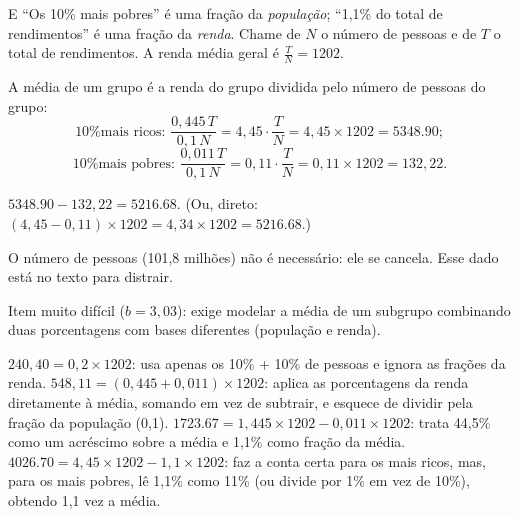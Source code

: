 \begin{resolucao}{E}
 ``Os 10\% mais pobres'' é uma fração da
\emph{população}; ``1,1\% do total de rendimentos'' é uma fração da
\emph{renda}. Chame de $N$ o número de pessoas e de $T$ o total de rendimentos.
A renda média geral é $\frac{T}{N} = \num{1202}$.

 A média de um grupo é a renda do grupo
dividida pelo número de pessoas do grupo:
\[
  \text{10\% mais ricos: } \frac{0{,}445\,T}{0{,}1\,N} = 4{,}45\cdot\frac{T}{N}
  = 4{,}45\times\num{1202} = \num{5348,90};
\]
\[
  \text{10\% mais pobres: } \frac{0{,}011\,T}{0{,}1\,N} = 0{,}11\cdot\frac{T}{N}
  = 0{,}11\times\num{1202} = 132{,}22.
\]

 $\num{5348,90} - 132{,}22 = \num{5216,68}$. (Ou, direto:
$(4{,}45 - 0{,}11)\times\num{1202} = 4{,}34\times\num{1202} = \num{5216,68}$.)

 O número de pessoas (101,8 milhões) não é necessário:
ele se cancela. Esse dado está no texto para distrair.


Item muito difícil ($b = 3{,}03$): exige modelar a média de um subgrupo
combinando duas porcentagens com bases diferentes (população e renda).
\begin{distratores}
 $240{,}40 = 0{,}2\times\num{1202}$: usa apenas os 10\% + 10\% de pessoas
e ignora as frações da renda.
 $548{,}11 = (0{,}445 + 0{,}011)\times\num{1202}$: aplica as porcentagens da
renda diretamente à média, somando em vez de subtrair, e esquece de dividir
pela fração da população (0,1).
 $\num{1723,67} = 1{,}445\times\num{1202} - 0{,}011\times\num{1202}$: trata
44,5\% como um acréscimo sobre a média e 1,1\% como fração da média.
 $\num{4026,70} = 4{,}45\times\num{1202} - 1{,}1\times\num{1202}$: faz a
conta certa para os mais ricos, mas, para os mais pobres, lê 1,1\% como 11\%
(ou divide por 1\% em vez de 10\%), obtendo 1,1 vez a média.
\end{distratores}
\end{resolucao}

\secaoineditas

